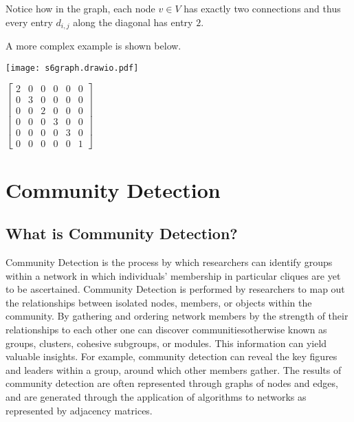 \documentclass{article}
\begin{document}
\bigskip

Notice how in the graph, each node $v\in V$ has exactly two connections and thus every entry $d_{i, j}$ along the diagonal has entry $2$.


\bigskip

\noindent A more complex example is shown below.

\bigskip

\noindent\begin{minipage}{.5\textwidth}
\centering
\texttt{[image: s6graph.drawio.pdf]}
\label{fig:fig5}            
\end{minipage}%
\begin{minipage}{.5\textwidth}
\centering
\vspace{0.5cm}
$\begin{bmatrix}
2 & 0 & 0 & 0 & 0 & 0\\
0 & 3 & 0 & 0 & 0 & 0\\
0 & 0 & 2 & 0 & 0 & 0\\
0 & 0 & 0 & 3 & 0 & 0\\
0 & 0 & 0 & 0 & 3 & 0\\
0 & 0 & 0 & 0 & 0 & 1
\end{bmatrix}$
\vspace{0.5cm}

\label{fig:fig6}            
\end{minipage}

\bigskip



\bigskip 

\section{Community Detection}

\subsection{What is Community Detection?}

Community Detection is the process by which researchers can identify groups within a network in which individuals' membership in particular cliques are yet to be ascertained. 
Community Detection is performed by researchers to map out the relationships between isolated nodes, members, or objects within the community. 
By gathering and ordering network members by the strength of their relationships to each other one can discover communities\textemdash otherwise known as groups, clusters, cohesive subgroups, or modules. 
This information can yield valuable insights. For example, community detection can reveal the key figures and leaders within a group, around which other members gather.
The results of community detection are often represented through graphs of nodes and edges, and are generated through the application of algorithms to networks as represented by adjacency matrices.
\end{document}
